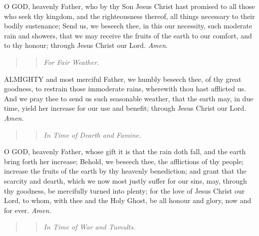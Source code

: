 O
GOD, heavenly Father, who by thy Son Jesus Christ hast promised to all
those who seek thy kingdom, and the righteousness thereof, all things
necessary to their bodily sustenance; Send us, we beseech thee, in this
our necessity, such moderate rain and showers, that we may receive the
fruits of the earth to our comfort, and to thy honour; through Jesus Christ
our Lord. \emph{Amen}.

\begin{quote}

\begin{quote}

\emph{For
Fair Weather.}

\end{quote}

\end{quote}

ALMIGHTY
and most merciful Father, we humbly beseech thee, of thy great goodness,
to restrain those immoderate rains, wherewith thou hast afflicted us.
And we pray thee to send us such seasonable weather, that the earth may,
in due time, yield her increase for our use and benefit; through Jesus
Christ our Lord. \emph{Amen}.

\begin{quote}

\begin{quote}

\emph{In
Time of Dearth and Famine.}

\end{quote}

\end{quote}

O
GOD, heavenly Father, whose gift it is that the rain doth fall, and the
earth bring forth her increase; Behold, we beseech thee, the afflictions
of thy people; increase the fruits of the earth by thy heavenly benediction;
and grant that the scarcity and dearth, which we now most justly suffer
for our sins, may, through thy goodness, be mercifully turned into plenty;
for the love of Jesus Christ our Lord, to whom, with thee and the Holy
Ghost, be all honour and glory, now and for ever. \emph{Amen}.

\begin{quote}

\begin{quote}

\emph{In
Time of War and Tumults.}

\end{quote}

\end{quote}

